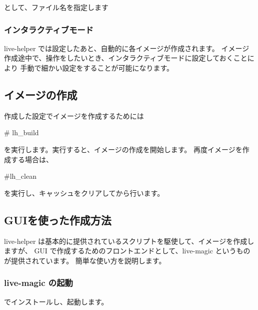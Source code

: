 \documentclass[mingoth,a4paper]{jsarticle}
\begin{document}
\begin{commandline}
\end{commandline}
として、ファイル名を指定します

\subsubsection{インタラクティブモード}
live-helper では設定したあと、自動的に各イメージが作成されます。
イメージ作成途中で、操作をしたいとき、インタラクティブモードに設定しておくことにより
手動で細かい設定をすることが可能になります。

\begin{commandline}
\end{commandline}


\subsection{イメージの作成}
作成した設定でイメージを作成するためには

\begin{commandline}
# lh_build
\end{commandline}

を実行します。実行すると、イメージの作成を開始します。
再度イメージを作成する場合は、
\begin{commandline}
#lh_clean
\end{commandline}
を実行し、キャッシュをクリアしてから行います。

\subsection{GUIを使った作成方法}
live-helper は基本的に提供されているスクリプトを駆使して、イメージを作成しますが、
GUI で作成するためのフロントエンドとして、live-magic というものが提供されています。
簡単な使い方を説明します。

\subsubsection{live-magic の起動}

\begin{commandline}
\end{commandline}
でインストールし、起動します。
\end{document}
